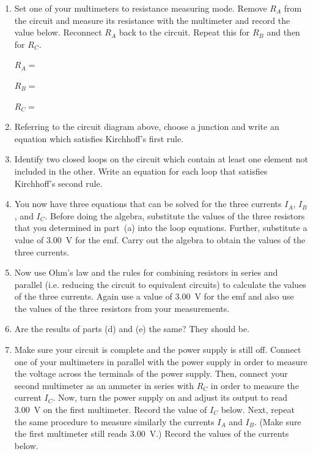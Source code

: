\begin{enumerate}[labparts]

\item Set one of your multimeters to resistance measuring mode. Remove $R_A$ from the circuit and measure its resistance with the multimeter and record the value below. Reconnect $R_A$ back to the circuit. Repeat this for $R_B$ and then for $R_C$.

\hspace{0.5in}$R_A=$

\hspace{0.5in}$R_B=$

\hspace{0.5in}$R_C=$


\item Referring to the circuit diagram above, choose a junction and write an equation
which satisfies Kirchhoff's first rule.
\answerspace{20mm}

\item Identify two closed loops on the circuit which contain at least one
element not included in the other. Write an equation for each loop
that satisfies Kirchhoff's second rule.
\answerspace{30mm}

\item You now have three equations that can be solved for the three currents $I_A$, $I_B$, and $I_C$.
Before doing the algebra, substitute the values of the three resistors that you determined in part~(a) into the loop equations. Further, substitute a value of 3.00~V for the emf. Carry out the algebra to obtain the values of the three currents.
\answerspace{5in}

\item Now use Ohm's law and the rules for combining resistors in series and parallel (i.e. reducing the circuit to equivalent circuits) to calculate the values of the three currents. Again use a value of 3.00~V for the emf and also use the values of the three resistors from your measurements.
\answerspace{50mm}

\item Are the results of parts (d) and (e) the same? They should be.
\answerspace{15mm}

\item Make sure your circuit is complete and the power supply is still off. Connect one of your multimeters in parallel with the power supply in order to measure the voltage across the terminals of the power supply. Then, connect your second multimeter as an ammeter in series with $R_C$ in order to measure the current $I_C$. Now, turn the power supply on and adjust its output to read 3.00~V on the first multimeter. Record the value of $I_C$ below. Next, repeat the same procedure to measure similarly the currents $I_A$ and $I_B$. (Make sure the first multimeter still reads 3.00~V.) Record the values of the currents below.


\end{enumerate}
